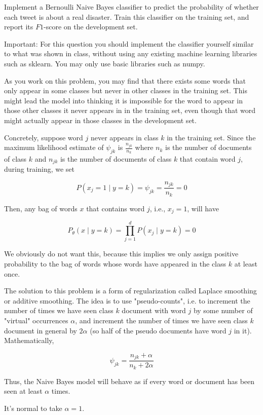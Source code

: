 \documentclass[10pt, a4paper]{article}
\begin{document}
\begin{Problem*}
    Implement a Bernoulli Naive Bayes classifier to predict the probability of whether each tweet is about a real disaster. Train this classifier on the training set, and report its $F 1$-score on the development set.

Important: For this question you should implement the classifier yourself similar to what was shown in class, without using any existing machine learning libraries such as sklearn. You may only use basic libraries such as numpy.

As you work on this problem, you may find that there exists some words that only appear in some classes but never in other classes in the training set. This might lead the model into thinking it is impossible for the word to appear in those other classes it never appears in in the training set, even though that word might actually appear in those classes in the development set.

Concretely, suppose word $j$ never appears in class $k$ in the training set. Since the maximum likelihood estimate of $\psi_{j k}$ is $\frac{n_{j k}}{n_{k}}$ where $n_{k}$ is the number of documents of class $k$ and $n_{j k}$ is the number of documents of class $k$ that contain word $j$, during training, we set

$$
P\left(x_{j}=1 \mid y=k\right)=\psi_{j k}=\frac{n_{j k}}{n_{k}}=0
$$

Then, any bag of words $x$ that contains word $j$, i.e., $x_{j}=1$, will have

$$
P_{\theta}(x \mid y=k)=\prod_{j=1}^{d} P\left(x_{j} \mid y=k\right)=0
$$

We obviously do not want this, because this implies we only assign positive probability to the bag of words whose words have appeared in the class $k$ at least once.

The solution to this problem is a form of regularization called Laplace smoothing or additive smoothing. The idea is to use "pseudo-counts", i.e. to increment the number of times we have seen class $k$ document with word $j$ by some number of "virtual" occurrences $\alpha$, and increment the number of times we have seen class $k$ document in general by $2 \alpha$ (so half of the pseudo documents have word $j$ in it). Mathematically,

$$
\psi_{j k}=\frac{n_{j k}+\alpha}{n_{k}+2 \alpha}
$$

Thus, the Naive Bayes model will behave as if every word or document has been seen at least $\alpha$ times.

It's normal to take $\alpha=1$.
\end{Problem*}
\end{document}
